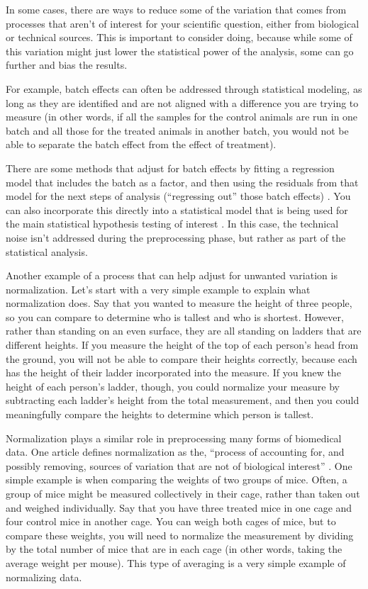 \documentclass[]{tufte-book}
\begin{document}
In some cases, there are ways to reduce some of the variation that comes from
processes that aren't of interest for your scientific question, either from
biological or technical sources. This is important to consider doing, because
while some of this variation might just lower the statistical power of the
analysis, some can go further and bias the results.

For example, batch effects can often be addressed through statistical modeling,
as long as they are identified and are not aligned with a difference you
are trying to measure (in other words, if all the samples for the control
animals are run in one batch and all those for the treated animals in
another batch, you would not be able to separate the batch effect from
the effect of treatment).

There are some methods that adjust for batch effects by fitting a regression
model that includes the batch as a factor, and then using the residuals from
that model for the next steps of analysis (``regressing out'' those batch effects)
\citep{mccarthy2017scater}. You can also incorporate this directly into a statistical
model that is being used for the main statistical hypothesis testing of interest
\citep{mccarthy2017scater}. In this case, the technical noise isn't addressed
during the preprocessing phase, but rather as part of the statistical analysis.

Another example of a process that can help adjust for unwanted variation is
normalization. Let's start with a very simple example to explain what
normalization does. Say that you wanted to measure the height of three people,
so you can compare to determine who is tallest and who is shortest.
However, rather than standing on an even surface, they are all standing on
ladders that are different heights. If you measure the height of the top of
each person's head from the ground, you will not be able to compare their
heights correctly, because each has the height of their ladder incorporated
into the measure. If you knew the height of each person's ladder, though,
you could normalize your measure by subtracting each ladder's height from
the total measurement, and then you could meaningfully compare the heights
to determine which person is tallest.

Normalization plays a similar role in preprocessing many forms of biomedical
data. One article defines normalization as the, ``process of accounting for, and
possibly removing, sources of variation that are not of biological interest''
\citep{mak2011john}. One simple example is when comparing the weights of two groups
of mice. Often, a group of mice might be measured collectively in their cage,
rather than taken out and weighed individually. Say that you have three treated
mice in one cage and four control mice in another cage. You can weigh both cages
of mice, but to compare these weights, you will need to normalize the
measurement by dividing by the total number of mice that are in each cage (in
other words, taking the average weight per mouse). This type of averaging is a
very simple example of normalizing data.
\end{document}
